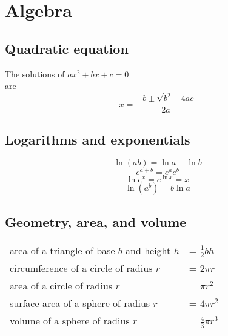 





\raggedbottom



\chapter{Algebra}
\label{algebra_appendix}
\raggedbottom 
\section{Quadratic equation}

  The solutions of $ax^2+bx+c=0$ \\
  are 
\begin{equation*}
x=\frac{-b\pm\sqrt{b^2-4ac}}{2a}
\end{equation*}


\section{Logarithms and exponentials}

  \begin{equation*}   \ln(ab)=\ln a + \ln b    \end{equation*}
  \begin{equation*}   e^{a+b} = e^ae^b    \end{equation*}
  \begin{equation*}   \ln e^x = e^{\ln x} = x    \end{equation*}
  \begin{equation*}   \ln(a^b) = b \ln a    \end{equation*}


\section{Geometry, area, and volume}

\noindent\begin{tabular}{ll}
  area of a triangle of base $b$ and height $h$     & = $\frac{1}{2}bh$ \\
  circumference of a circle of radius $r$           &= $2\pi r$ \\
  area of a circle of radius $r$                    &= $\pi r^2$ \\
  surface area of a sphere of radius $r$            &= $4\pi r^2$ \\
  volume of a sphere of radius $r$                  &= $\frac{4}{3}\pi r^3$
\end{tabular}

